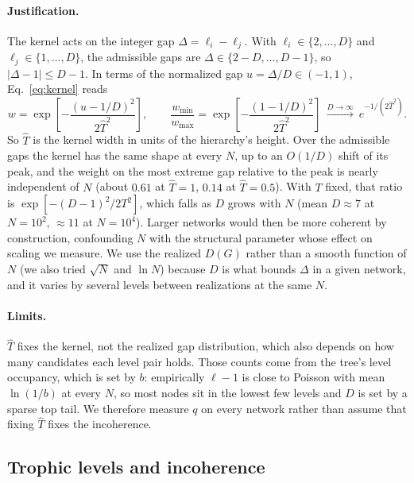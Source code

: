 \paragraph{Justification.}
The kernel acts on the integer gap $\Delta=\ell_i-\ell_j$. With
$\ell_i\in\{2,\dots,D\}$ and $\ell_j\in\{1,\dots,D\}$, the admissible gaps are
$\Delta\in\{2-D,\dots,D-1\}$, so $|\Delta-1|\le D-1$. In terms of the
normalized gap $u=\Delta/D\in(-1,1)$, Eq.~\eqref{eq:kernel} reads
\begin{equation}
  w=\exp\!\left[-\frac{(u-1/D)^2}{2\hat T^2}\right],
  \qquad
  \frac{w_{\min}}{w_{\max}}
  =\exp\!\left[-\frac{(1-1/D)^2}{2\hat T^2}\right]\ \xrightarrow{D\to\infty}\ e^{-1/(2\hat T^2)} .
  \label{eq:kernel-normalized}
\end{equation}
So $\hat T$ is the kernel width in units of the hierarchy's height. Over the
admissible gaps the kernel has the same shape at every $N$, up to an $O(1/D)$
shift of its peak, and the weight on the most extreme gap relative to the peak
is nearly independent of $N$ (about $0.61$ at $\hat T=1$, $0.14$ at
$\hat T=0.5$). With $T$ fixed, that ratio is $\exp[-(D-1)^2/2T^2]$, which falls
as $D$ grows with $N$ (mean $D\approx7$ at $N=10^2$, $\approx11$ at $N=10^4$).
Larger networks would then be more coherent by construction, confounding $N$
with the structural parameter whose effect on scaling we measure. We use the
realized $D(G)$ rather than a smooth function of $N$ (we also tried $\sqrt N$
and $\ln N$) because $D$ is what bounds $\Delta$ in a given network, and it
varies by several levels between realizations at the same $N$.

\paragraph{Limits.}
$\hat T$ fixes the kernel, not the realized gap distribution, which also
depends on how many candidates each level pair holds. Those counts come from
the tree's level occupancy, which is set by $b$: empirically $\ell-1$ is close
to Poisson with mean $\ln(1/b)$ at every $N$, so most nodes sit in the lowest
few levels and $D$ is set by a sparse top tail. We therefore measure $q$ on
every network rather than assume that fixing $\hat T$ fixes the incoherence.

\subsection{Trophic levels and incoherence}
\label{sec:coherence}

